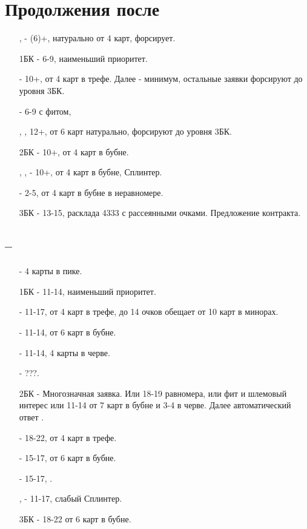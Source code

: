 \documentclass{article}
\begin{document}
\section{Продолжения после }
\begin{enumerate}
    \item[\he{1}, \sp{1}] - (6)+, натурально от 4 карт, форсирует.
    \item[1БК] - 6-9, наименьший приоритет.
    \item[\cl{2}] - 10+, от 4 карт в трефе. Далее  - минимум, остальные заявки форсируют до уровня 3БК.
    \item[\di{2}] - 6-9 с фитом,
    \item[\he{2}, \sp{2}], 12+, от 6 карт натурально, форсируют до уровня 3БК.
    \item[2БК] - 10+, от 4 карт в бубне.
    \item[\cl{3}, \he{3}, \sp{3}] - 10+, от 4 карт в бубне, Сплинтер.
    \item[\di{3}] - 2-5, от 4 карт в бубне в неравномере.
    \item[3БК] - 13-15, расклада 4333 с рассеянными очками. Предложение контракта.
\end{enumerate}
\subsection{ -- }
\begin{enumerate}
    \item[\sp{1}] - 4 карты в пике.
    \item[1БК] - 11-14, наименьший приоритет.
    \item[\cl{2}] - 11-17, от 4 карт в трефе, до 14 очков обещает от 10 карт в минорах. 
    \item[\di{2}] - 11-14, от 6 карт в бубне.
    \item[\he{2}] - 11-14, 4 карты в черве.
    \item[\sp{2}] - ???.
    \item[2БК] - Многозначная заявка. Или 18-19 равномера, или фит и шлемовый интерес или 11-14 от 7 карт в бубне и 3-4 в черве. Далее автоматический ответ .
    \item[\cl{3}] - 18-22, от 4 карт в трефе.
    \item[\di{3}] - 15-17, от 6 карт в бубне.
    \item[\he{3}] - 15-17, .
    \item[\sp{3}, \cl{4}] - 11-17, слабый Сплинтер.
    \item[3БК] - 18-22 от 6 карт в бубне.
\end{enumerate}
\end{document}
